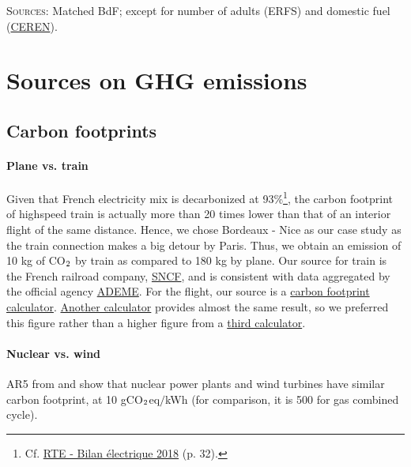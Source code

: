 \documentclass[english,5p,authoryear]{elsarticle}
\begin{document}
\begin{appendices}
\begin{table}[!htbp]
     \footnotesize{\textsc{Sources:} Matched BdF; except for number of adults (ERFS) and domestic fuel (\href{https://www.lesechos.fr/industrie-services/energie-environnement/le-chauffage-au-fioul-devient-de-plus-en-plus-cher-147372}{CEREN}).}
\end{table}

\section{Sources on GHG emissions\label{app:sources}}

\subsection{Carbon footprints\label{app:footprint}}

\paragraph{Plane vs. train}

Given that French electricity mix is decarbonized at 93\%\footnote{Cf. \href{https://www.rte-france.com/sites/default/files/be_pdf_2018v3.pdf}{RTE - Bilan électrique 2018} (p. 32).}, the carbon footprint of highspeed train is actually more than 20 times lower than that of an interior flight of the same distance. Hence, we chose Bordeaux - Nice as our case study as the train connection makes a big detour by Paris. Thus, we obtain an emission of 10 kg of CO$_\textnormal{2}$ by train as compared to 180 kg by plane. Our source for train is the French railroad company, \href{https://www.oui.sncf/aide/calcul-des-emissions-de-co2-sur-votre-trajet-en-train}{SNCF}, and is consistent with data aggregated by the official agency \href{basecarbone.fr}{ADEME}. For the flight, our source is a  \href{https://calculator.carbonfootprint.com/calculator.aspx?tab=3}{carbon footprint calculator}. \href{http://www.climatecare.org/home.aspx}{Another calculator} provides almost the same result, so we preferred this figure rather than a higher figure from a \href{https://co2.myclimate.org/fr/flight_calculators}{third calculator}.

\paragraph{Nuclear vs. wind}

AR5 from \citet{ar5_ar5_nodate} and \citet{pehl_understanding_2017} show that nuclear power plants and wind turbines have similar carbon footprint, at 10 gCO$_\textnormal{2}$eq$/$kWh (for comparison, it is 500 for gas combined cycle).


\end{appendices}
\end{document}
